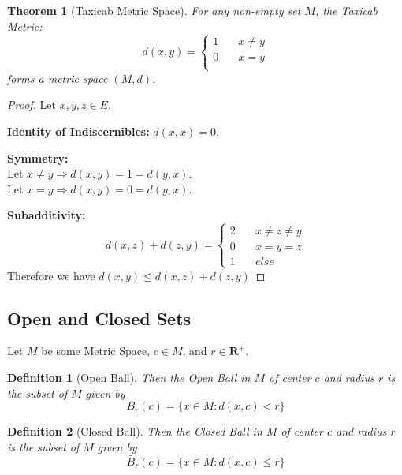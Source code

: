 \documentclass{article}
\newtheorem{definition}{Definition}[section]
\newtheorem{theorem}{Theorem}[section]
\begin{document}
			\begin{theorem}[Taxicab Metric Space]
			\label{taxicab metric space}
				For any non-empty set $M$, the Taxicab Metric:
				\begin{equation*}
					d(x, y)=\begin{cases}
							  1 \quad & x \neq y \\
							  0 \quad & x = y \\
						 \end{cases}
				\end{equation*}
				forms a metric space $(M, d)$.
				\end{theorem}
				\begin{proof}
					Let $x, y, z \in E$.
					\item \textbf{Identity of Indiscernibles:} $d(x, x) = 0$.
					\item \textbf{Symmetry:} \\
						Let $x \neq y \Rightarrow d(x, y) = 1 = d(y, x)$. \\
						Let $x=y \Rightarrow d(x, y) = 0 = d(y, x)$.
					\item \textbf{Subadditivity:}
						\begin{equation*}
							d(x, z) + d(z, y)=\begin{cases}
									2 \quad & x \neq z \neq y \\
									0 \quad & x = y = z \\
									1 \quad &else
								\end{cases}
						\end{equation*}
						Therefore we have $d(x, y) \leq d(x, z) + d(z, y)$

				\end{proof}
		\subsection{Open and Closed Sets}
			Let $M$ be some Metric Space, $c \in M$, and $r \in \mathbf{R}^+$.
			\begin{definition}[Open Ball]
			\label{open ball}
				Then the Open Ball in $M$ of center $c$ and radius $r$ is the subset of $M$ given by
				$$B_r(c) = \{x \in M: d(x, c) < r \}$$
			\end{definition}
		
			\begin{definition}[Closed Ball]
			\label{closed ball}
				Then the Closed Ball in $M$ of center $c$ and radius $r$ is the subset of $M$ given by
				$$\bar{B}_r(c) = \{x \in M: d(x, c) \leq r \}$$
			\end{definition}
\end{document}
